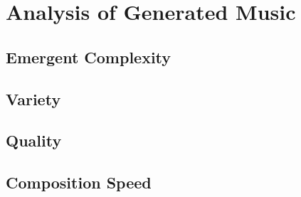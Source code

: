 \section{Analysis of Generated Music}

\subsection{Emergent Complexity} 

\subsection{Variety} 

\subsection{Quality} 

\subsection{Composition Speed} 
